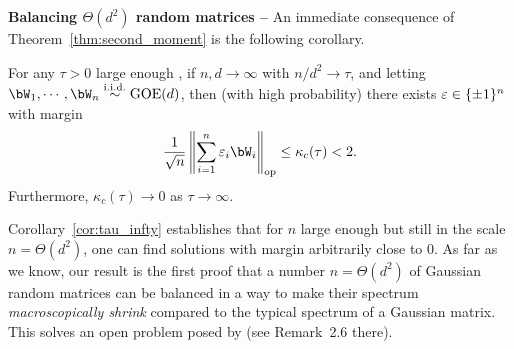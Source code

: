 \myskip
\textbf{Balancing $\Theta(d^2)$ random matrices -- }
An immediate consequence of Theorem~\ref{thm:second_moment} is the following corollary.
\begin{corollary}\label{cor:tau_infty}
    For any $\tau > 0$ large enough\footnotemark%
    , if $n,d \to \infty$ with $n / d^2 \to \tau$, and letting $\bW_1, \cdots, \bW_n \iid \GOE(d)$,
    then (with high probability) there exists $\varepsilon \in \{\pm 1\}^n$ with margin 
    \begin{equation*}
        \frac{1}{\sqrt{n}} \left\|\sum_{i=1}^n \eps_i \bW_i\right\|_\op \leq \kappa_c(\tau) < 2.
    \end{equation*}
    Furthermore, $\kappa_c(\tau) \to 0$ as $\tau \to \infty$.
\end{corollary}
\noindent
Corollary~\ref{cor:tau_infty} establishes that for $n$ large enough but still in the scale $n = \Theta(d^2)$, one can find solutions 
with margin arbitrarily close to $0$.
As far as we know, our result is the first proof that a number $n = \Theta(d^2)$ of Gaussian random matrices can be balanced in a way to make 
their spectrum \emph{macroscopically shrink} compared to the typical spectrum of a Gaussian matrix.
This solves an open problem posed by \cite{kunisky2023online} (see Remark~2.6 there).


